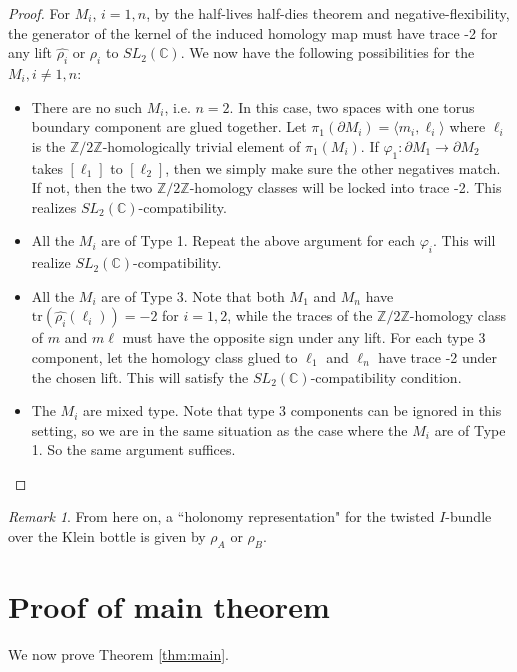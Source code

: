\documentclass{article}
\theoremstyle{plain}
\theoremstyle{definition}
\theoremstyle{plain}
\theoremstyle{plain}
\theoremstyle{plain}
\theoremstyle{remark}
\newtheorem{remark}[theorem]{Remark}
\theoremstyle{remark}
\theoremstyle{plain}
\theoremstyle{plain}
\begin{document}
\begin{proof}
For $M_i$, $i = 1, n$, by the half-lives half-dies theorem and negative-flexibility, the generator of the kernel of the induced homology map must have trace -2 for any lift $\widehat{\rho_i}$ or $\rho_i$ to $SL_2(\mathbb{C})$. We now have the following possibilities for the $M_i, i \neq 1, n$:
\begin{itemize}
	\item There are no such $M_i$, i.e. $n = 2$. In this case, two spaces with one torus boundary component are glued together. Let $\pi_1(\partial M_i) = \langle m_i, \ell_i \rangle$ where $\ell_i$ is the $\mathbb{Z}/2\mathbb{Z}$-homologically trivial element of $\pi_1(M_i)$. If $\varphi_1: \partial M_1 \to \partial M_2$ takes $[\ell_1]$ to $[\ell_2]$, then we simply make sure the other negatives match. If not, then the two $\mathbb{Z}/2\mathbb{Z}$-homology classes will be locked into trace -2. This realizes $SL_2(\mathbb{C})$-compatibility. 
	\item All the $M_i$ are of Type 1. Repeat the above argument for each $\varphi_i$. This will realize $SL_2(\mathbb{C})$-compatibility. 
	\item All the $M_i$ are of Type 3. Note that both $M_1$ and $M_n$ have $\text{tr}(\widehat{\rho_i}(\ell_i)) = -2$ for $i = 1, 2$, while the traces of the $\mathbb{Z}/2\mathbb{Z}$-homology class of $m$ and $m\ell$ must have the opposite sign under any lift. For each type 3 component, let the homology class glued to $\ell_1$ and $\ell_n$ have trace -2 under the chosen lift. This will satisfy the $SL_2(\mathbb{C})$-compatibility condition. 
	\item The $M_i$ are mixed type. Note that type 3 components can be ignored in this setting, so we are in the same situation as the case where the $M_i$ are of Type 1. So the same argument suffices. 
\end{itemize}
\end{proof}

\begin{remark}
From here on, a ``holonomy representation" for the twisted $I$-bundle over the Klein bottle is given by $\rho_A$ or $\rho_B$.
\end{remark}

\section{Proof of main theorem}\label{sec:proof}

We now prove Theorem \ref{thm:main}.
\end{document}
